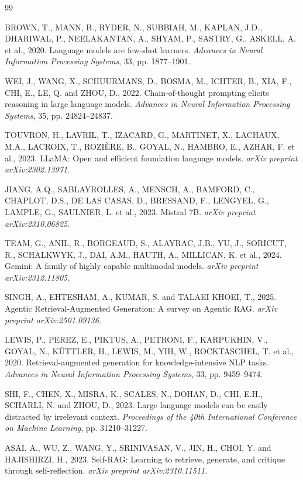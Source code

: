 \documentclass[12pt,a4paper]{article}
\begin{document}

\begin{thebibliography}{99}

BROWN, T., MANN, B., RYDER, N., SUBBIAH, M., KAPLAN, J.D., DHARIWAL, P., NEELAKANTAN, A., SHYAM, P., SASTRY, G., ASKELL, A. et al., 2020. Language models are few-shot learners. \textit{Advances in Neural Information Processing Systems}, 33, pp. 1877--1901.

WEI, J., WANG, X., SCHUURMANS, D., BOSMA, M., ICHTER, B., XIA, F., CHI, E., LE, Q. and ZHOU, D., 2022. Chain-of-thought prompting elicits reasoning in large language models. \textit{Advances in Neural Information Processing Systems}, 35, pp. 24824--24837.

TOUVRON, H., LAVRIL, T., IZACARD, G., MARTINET, X., LACHAUX, M.A., LACROIX, T., ROZIÈRE, B., GOYAL, N., HAMBRO, E., AZHAR, F. et al., 2023. LLaMA: Open and efficient foundation language models. \textit{arXiv preprint arXiv:2302.13971}.

JIANG, A.Q., SABLAYROLLES, A., MENSCH, A., BAMFORD, C., CHAPLOT, D.S., DE LAS CASAS, D., BRESSAND, F., LENGYEL, G., LAMPLE, G., SAULNIER, L. et al., 2023. Mistral 7B. \textit{arXiv preprint arXiv:2310.06825}.

TEAM, G., ANIL, R., BORGEAUD, S., ALAYRAC, J.B., YU, J., SORICUT, R., SCHALKWYK, J., DAI, A.M., HAUTH, A., MILLICAN, K. et al., 2024. Gemini: A family of highly capable multimodal models. \textit{arXiv preprint arXiv:2312.11805}.

SINGH, A., EHTESHAM, A., KUMAR, S. and TALAEI KHOEI, T., 2025. Agentic Retrieval-Augmented Generation: A survey on Agentic RAG. \textit{arXiv preprint arXiv:2501.09136}.

LEWIS, P., PEREZ, E., PIKTUS, A., PETRONI, F., KARPUKHIN, V., GOYAL, N., KÜTTLER, H., LEWIS, M., YIH, W., ROCKTÄSCHEL, T. et al., 2020. Retrieval-augmented generation for knowledge-intensive NLP tasks. \textit{Advances in Neural Information Processing Systems}, 33, pp. 9459--9474.

SHI, F., CHEN, X., MISRA, K., SCALES, N., DOHAN, D., CHI, E.H., SCHARLI, N. and ZHOU, D., 2023. Large language models can be easily distracted by irrelevant context. \textit{Proceedings of the 40th International Conference on Machine Learning}, pp. 31210--31227.

ASAI, A., WU, Z., WANG, Y., SRINIVASAN, V., JIN, H., CHOI, Y. and HAJISHIRZI, H., 2023. Self-RAG: Learning to retrieve, generate, and critique through self-reflection. \textit{arXiv preprint arXiv:2310.11511}.


\end{thebibliography}
\end{document}

